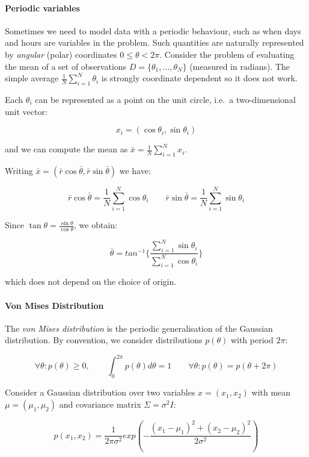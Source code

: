 \documentclass{article}
\begin{document}
\paragraph{Periodic variables}\label{periodic-variables}

Sometimes we need to model data with a periodic behaviour, such as when
days and hours are variables in the problem. Such quantities are
naturally represented by \emph{angular} (polar) coordinates
\(0 \le \theta < 2\pi\). Consider the problem of evaluating the mean of
a set of observations \(D = \{\theta_1, ..., \theta_N\}\) (measured in
radians). The simple average \(\frac{1}{N}\sum_{i=1}^N \theta_i\) is
strongly coordinate dependent so it does not work.

Each \(\theta_i\) can be represented as a point on the unit circle,
i.e.~a two-dimensional unit vector:

\[x_i = (\cos \theta_i, \sin \theta_i )\]

and we can compute the mean as
\(\bar{x} = \frac{1}{N} \sum_{i=1}^N x_i\).

Writing
\(\bar{x} = (\bar{r} \cos \bar{\theta}, \bar{r} \sin \bar{\theta})\) we
have:

\[\bar{r} \cos \bar{\theta} = \frac{1}{N} \sum_{i=1}^N \cos \theta_i \qquad
\bar{r} \sin \bar{\theta} = \frac{1}{N} \sum_{i=1}^N \sin \theta_i\]

Since \(\tan \theta = \frac{\sin \theta}{\cos \theta}\), we obtain:

\[\bar{\theta} = tan^{-1} \{ \frac{\sum_{i=1}^N \sin \theta_i}{\sum_{i=1}^N \cos
\theta_i} \}\]

which does not depend on the choice of origin.

\paragraph{Von Mises Distribution}\label{von-mises-distribution}

The \emph{von Mises distribution} is the periodic generalisation of the
Gaussian distribution. By convention, we consider distributions
\(p(\theta)\) with period \(2\pi\):

\[\forall \theta: p(\theta) \ge 0, \qquad \int_0^{2\pi} p(\theta) d\theta = 1
\qquad \forall \theta: p(\theta) = p(\theta + 2\pi)\]

Consider a Gaussian distribution over two variables \(x = (x_1, x_2)\)
with mean \(\mu = (\mu_1, \mu_2)\) and covariance matrix
\(\Sigma = \sigma^2 I\):

\[p(x_1, x_2) = \frac{1}{2\pi \sigma^2} exp(-\frac{(x_1 - \mu_1)^2 + (x_2 -
\mu_2)^2}{2 \sigma^2})\]
\end{document}
